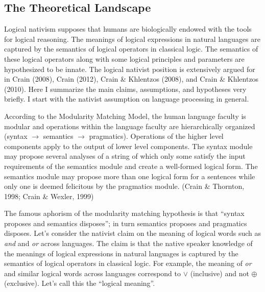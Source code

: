 \documentclass[oneside]{report}
\theoremstyle{definition}
\theoremstyle{definition}
\theoremstyle{definition}
\theoremstyle{remark}
\begin{document}
\subsection{The Theoretical Landscape}\label{the-theoretical-landscape}

Logical nativism supposes that humans are biologically endowed with the
tools for logical reasoning. The meanings of logical expressions in
natural languages are captured by the semantics of logical operators in
classical logic. The semantics of these logical operators along with
some logical principles and parameters are hypothesized to be innate.
The logical nativist position is extensively argued for in Crain (2008),
Crain (2012), Crain \& Khlentzos (2008), and Crain \& Khlentzos (2010).
Here I summarize the main claims, assumptions, and hypotheses very
briefly. I start with the nativist assumption on language processing in
general.

According to the Modularity Matching Model, the human language faculty
is modular and operations within the language faculty are hierarchically
organized (syntax \(\rightarrow\) semantics \(\rightarrow\) pragmatics).
Operations of the higher level components apply to the output of lower
level components. The syntax module may propose several analyses of a
string of which only some satisfy the input requirements of the
semantics module and create a well-formed logical form. The semantics
module may propose more than one logical form for a sentences while only
one is deemed felicitous by the pragmatics module. (Crain \& Thornton,
1998; Crain \& Wexler, 1999)

The famous aphorism of the modularity matching hypothesis is that
``syntax proposes and semantics disposes''; in turn semantics proposes
and pragmatics disposes. Let's consider the nativist claim on the
meaning of logical words such as \emph{and} and \emph{or} across
languages. The claim is that the native speaker knowledge of the
meanings of logical expressions in natural languages is captured by the
semantics of logical operators in classical logic. For example, the
meaning of \emph{or} and similar logical words across languages
correspond to \(\lor\) (inclusive) and not \(\oplus\) (exclusive). Let's
call this the ``logical meaning''.
\end{document}
